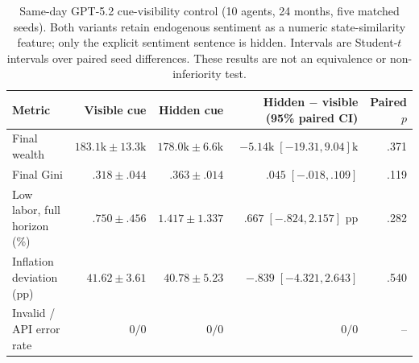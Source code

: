 \ifdefined\FinEvoAllowHistoricalPrePZeroEvidence\else
{}
\fi
\begin{table}[t]
\centering
\small
\setlength{\tabcolsep}{5pt}
\begin{tabular}{lrrrr}
\toprule
Metric & Visible cue & Hidden cue & Hidden $-$ visible (95\% paired CI) & Paired $p$ \\
\midrule
Final wealth & $183.1\mathrm{k}\pm13.3\mathrm{k}$ & $178.0\mathrm{k}\pm6.6\mathrm{k}$ & $-5.14\mathrm{k}\;[-19.31,9.04]\mathrm{k}$ & .371 \\
Final Gini & $.318\pm.044$ & $.363\pm.014$ & $.045\;[-.018,.109]$ & .119 \\
Low labor, full horizon (\%) & $.750\pm.456$ & $1.417\pm1.337$ & $.667\;[-.824,2.157]$ pp & .282 \\
Inflation deviation (pp) & $41.62\pm3.61$ & $40.78\pm5.23$ & $-.839\;[-4.321,2.643]$ & .540 \\
Invalid / API error rate & $0/0$ & $0/0$ & $0/0$ & -- \\
\bottomrule
\end{tabular}
\caption{Same-day GPT-5.2 cue-visibility control (10 agents, 24 months,
five matched seeds). Both variants retain endogenous sentiment as a numeric
state-similarity feature; only the explicit sentiment sentence is hidden.
Intervals are Student-$t$ intervals over paired seed differences. These results
are not an equivalence or non-inferiority test.}
\label{tab:no_visible_cue}
\end{table}
